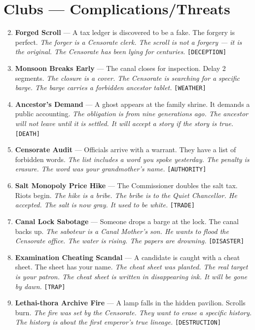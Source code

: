 \section*{Clubs --- Complications/Threats}
\label{sec:sihai-complications}
\begin{enumerate}
\setcounter{enumi}{1}
\item \textbf{Forged Scroll} --- A tax ledger is discovered to be a fake. The forgery is perfect.
  \hfill \textit{The forger is a Censorate clerk. The scroll is not a forgery --- it is the original. The Censorate has been lying for centuries.} \texttt{[DECEPTION]}
\item \textbf{Monsoon Breaks Early} --- The canal closes for inspection. Delay 2 segments.
  \hfill \textit{The closure is a cover. The Censorate is searching for a specific barge. The barge carries a forbidden ancestor tablet.} \texttt{[WEATHER]}
\item \textbf{Ancestor's Demand} --- A ghost appears at the family shrine. It demands a public accounting.
  \hfill \textit{The obligation is from nine generations ago. The ancestor will not leave until it is settled. It will accept a story if the story is true.} \texttt{[DEATH]}
\item \textbf{Censorate Audit} --- Officials arrive with a warrant. They have a list of forbidden words.
  \hfill \textit{The list includes a word you spoke yesterday. The penalty is erasure. The word was your grandmother's name.} \texttt{[AUTHORITY]}
\item \textbf{Salt Monopoly Price Hike} --- The Commissioner doubles the salt tax. Riots begin.
  \hfill \textit{The hike is a bribe. The bribe is to the Quiet Chancellor. He accepted. The salt is now gray. It used to be white.} \texttt{[TRADE]}
\item \textbf{Canal Lock Sabotage} --- Someone drops a barge at the lock. The canal backs up.
  \hfill \textit{The saboteur is a Canal Mother's son. He wants to flood the Censorate office. The water is rising. The papers are drowning.} \texttt{[DISASTER]}
\item \textbf{Examination Cheating Scandal} --- A candidate is caught with a cheat sheet. The sheet has your name.
  \hfill \textit{The cheat sheet was planted. The real target is your patron. The cheat sheet is written in disappearing ink. It will be gone by dawn.} \texttt{[TRAP]}
\item \textbf{Lethai-thora Archive Fire} --- A lamp falls in the hidden pavilion. Scrolls burn.
  \hfill \textit{The fire was set by the Censorate. They want to erase a specific history. The history is about the first emperor's true lineage.} \texttt{[DESTRUCTION]}

\end{enumerate}
